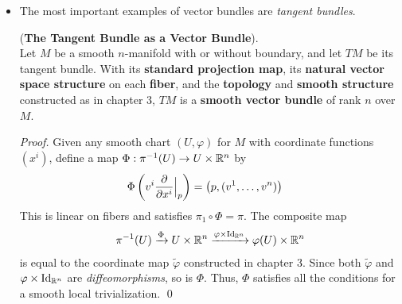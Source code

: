 \documentclass[11pt]{article}
\begin{document}
\begin{itemize}
\begin{example}
Consider the following \emph{commutative diagram}:
\[
  \begin{tikzcd}
    \bR^2 \arrow{r}{q} \arrow[swap]{d}{\pi_1} & E \arrow{d}{\pi} \\
    \bR \arrow{r}{\epsilon} & \bS^1,
  \end{tikzcd}
\] where $\pi_1$ is the \emph{\textbf{projection}} onto the \emph{first factor} and $\epsilon: \bR \rightarrow \bS^1$ is the \emph{\textbf{smooth covering map}} $\epsilon(x) = \exp\paren{2\pi\,j x}$. Because $\epsilon \circ \pi_1$ is \emph{\textbf{constant}} on \emph{each equivalence class}, it descends to \emph{\textbf{a continuous map}} $\pi: E \rightarrow \bS^1$.

A straightforward (if tedious) verification shows that $E$ has a \emph{unique smooth manifold structure} such that $q$ is \emph{\textbf{a smooth covering map}} and $\pi: E \rightarrow \bS^1$ is \emph{\textbf{a smooth real line bundle}} over $\bS^1$, called \emph{\textbf{the M{\"o}bius bundle}}. \qed

\end{example}

\item The most important examples of vector bundles are \emph{tangent bundles}.
\begin{proposition} (\textbf{The Tangent Bundle as a Vector Bundle}).\\
 Let $M$ be a smooth $n$-manifold with or without boundary, and let $TM$ be its tangent bundle. With its \textbf{standard projection map}, its \textbf{natural vector space structure} on each \textbf{fiber}, and the \textbf{topology} and \textbf{smooth structure} constructed as in chapter 3, $TM$ is a \textbf{smooth vector bundle} of rank $n$ over $M$.
\end{proposition}
\begin{proof}
Given any smooth chart $(U, \varphi)$ for $M$ with coordinate functions $(x^i)$, define a map $\Phi: \pi^{-1}(U) \rightarrow U \times {\mathbb R}^n$ by
\begin{align*}
\Phi\left(v^{i}\frac{\partial }{ \partial x^{i}}\Bigr|_{p}\right) &= \left(p, (v^1, \ldots, v^n)\right)
\end{align*} This is linear on fibers and satisfies $\pi_1 \circ \Phi = \pi$. The composite map
\begin{align*}
\pi^{-1}(U) \xrightarrow{\Phi} U \times {\mathbb R}^n \xrightarrow{\varphi \times \text{Id}_{{\mathbb R}^n}} \varphi(U) \times {\mathbb R}^{n}
\end{align*} is equal to the coordinate map $\widetilde{\varphi}$ constructed in chapter 3. Since both $\widetilde{\varphi}$ and $\varphi \times \text{Id}_{{\mathbb R}^n}$ are \emph{diffeomorphisms}, so is $\Phi$. Thus,  $\Phi$ satisfies all the conditions for a smooth local trivialization.  \qed
\end{proof}



\end{itemize}
\end{document}
